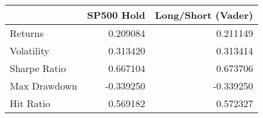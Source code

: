 \begin{tabular}{lrr}
\toprule
{} &  SP500 Hold &  Long/Short (Vader) \\
\midrule
Returns      &    0.209084 &            0.211149 \\
Volatility   &    0.313420 &            0.313414 \\
Sharpe Ratio &    0.667104 &            0.673706 \\
Max Drawdown &   -0.339250 &           -0.339250 \\
Hit Ratio    &    0.569182 &            0.572327 \\
\bottomrule
\end{tabular}
